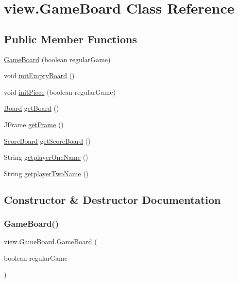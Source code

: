 \hypertarget{classview_1_1_game_board}{}\section{view.\+Game\+Board Class Reference}
\label{classview_1_1_game_board}
\subsection*{Public Member Functions}
\begin{DoxyCompactItemize}
\item 
\mbox{\hyperlink{classview_1_1_game_board_a2acdba47aa0fe2f59a5e005f63562a62}{Game\+Board}} (boolean regular\+Game)
\item 
void \mbox{\hyperlink{classview_1_1_game_board_aa30495f6887adc93e8b1fac7aee50b7a}{init\+Empty\+Board}} ()
\item 
void \mbox{\hyperlink{classview_1_1_game_board_aab3d1895eebf04e0053b64aa77abe5a3}{init\+Piece}} (boolean regular\+Game)
\item 
\mbox{\hyperlink{classview_1_1_board}{Board}} \mbox{\hyperlink{classview_1_1_game_board_aeaf6c2e6d2daa244607497d69fab6a7d}{get\+Board}} ()
\item 
J\+Frame \mbox{\hyperlink{classview_1_1_game_board_a09bcfcd93e2be82b26cfd730f5b23f76}{get\+Frame}} ()
\item 
\mbox{\hyperlink{classview_1_1_score_board}{Score\+Board}} \mbox{\hyperlink{classview_1_1_game_board_ac720420b95f412df2dfc9ca2de0a2e0a}{get\+Score\+Board}} ()
\item 
String \mbox{\hyperlink{classview_1_1_game_board_a1fd1c5a38e8342f2fd8d076f9e89ebe7}{getplayer\+One\+Name}} ()
\item 
String \mbox{\hyperlink{classview_1_1_game_board_a4a45667a125320d690dcbda231c70db5}{getplayer\+Two\+Name}} ()
\end{DoxyCompactItemize}


\subsection{Constructor \& Destructor Documentation}
\mbox{\label{classview_1_1_game_board_a2acdba47aa0fe2f59a5e005f63562a62}} 
\subsubsection{\texorpdfstring{GameBoard()}{GameBoard()}}
{\footnotesize\ttfamily view.\+Game\+Board.\+Game\+Board (\begin{DoxyParamCaption}\item[{boolean}]{regular\+Game }\end{DoxyParamCaption})\hspace{0.3cm}{\ttfamily [inline]}}

